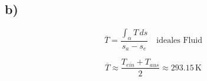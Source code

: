 

\subsection*{b)}
\[
\overline{T} = \frac{\int_{\alpha} T \, ds}{s_a - s_e} \quad \text{ideales Fluid}
\]

\[
\overline{T} \approx \frac{T_{ein} + T_{aus}}{2} \approx 293.15 \, \text{K}
\]